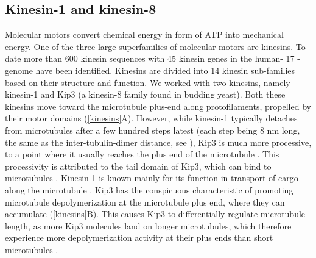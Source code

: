 \subsection{Kinesin-1 and kinesin-8}
Molecular motors convert chemical energy in form of ATP into mechanical energy. One of the three large superfamilies of molecular motors are kinesins. To date more than 600 kinesin sequences with 45 kinesin genes in the human- 17 -genome \parencite{Endow3420} have been identified. Kinesins are divided into 14 kinesin sub-families based on their structure and function. We worked with two kinesins, namely kinesin-1 and Kip3 (a kinesin-8 family found in budding yeast). Both these kinesins move toward the microtubule plus-end along protofilaments, propelled by their motor domains (\autoref{kinesins}A). However, while kinesin-1 typically detaches from microtubules after a few hundred steps latest (each step being 8 nm long, the same as the inter-tubulin-dimer distance, see \cite{COY19993667}), Kip3 is much more processive, to a point where it usually reaches the plus end of the microtubule \cite{Varga2009}. This processivity is attributed to the tail domain of Kip3, which can bind to microtubules \parencite{SU2011751}. Kinesin-1 is known mainly for its function in transport of cargo along the microtubule \parencite{Endow3420}. Kip3 has the conspicuous characteristic of promoting microtubule depolymerization at the microtubule plus end, where they can accumulate (\autoref{kinesins}B). This causes Kip3 to differentially regulate microtubule length, as more Kip3 molecules land on longer microtubules, which therefore experience more depolymerization activity at their plus ends than short microtubules \parencite{Varga2009}.
